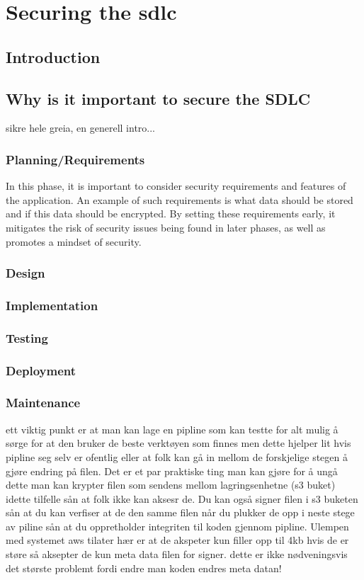 
\section{Securing the \acrshort{sdlc}}

\subsection{Introduction}

\subsection{Why is it important to secure the SDLC}
sikre hele greia, en generell intro...

\subsubsection{Planning/Requirements}
In this phase, it is important to consider security requirements and features of the application. An example of such requirements is what data should be stored and if this data should be encrypted. By setting these requirements early, it mitigates the risk of security issues being found in later phases, as well as promotes a mindset of security. \cite{securerequirements}
\subsubsection{Design}

\subsubsection{Implementation}
\subsubsection{Testing}
\subsubsection{Deployment}
\subsubsection{Maintenance}

ett viktig punkt er at man kan lage en pipline som kan testte for alt mulig å sørge for at den bruker de beste verktøyen som finnes men dette hjelper lit hvis pipline seg selv er ofentlig eller at folk kan gå in mellom de forskjelige stegen å gjøre endring på filen. Det er et par praktiske ting man kan gjøre for å ungå dette man kan krypter filen som sendens mellom lagringsenhetne (s3 buket) idette tilfelle sån at folk ikke kan aksesr de. Du kan også signer filen i s3 buketen sån at du kan verfiser at de den samme filen når du plukker de opp i neste stege av piline sån at du oppretholder integriten til koden gjennom pipline. Ulempen med systemet aws tilater hær er at de akspeter kun filler opp til 4kb hvis de er støre så aksepter de kun meta data filen for signer. dette er ikke nødveningsvis det største problemt fordi endre man koden endres meta datan!

